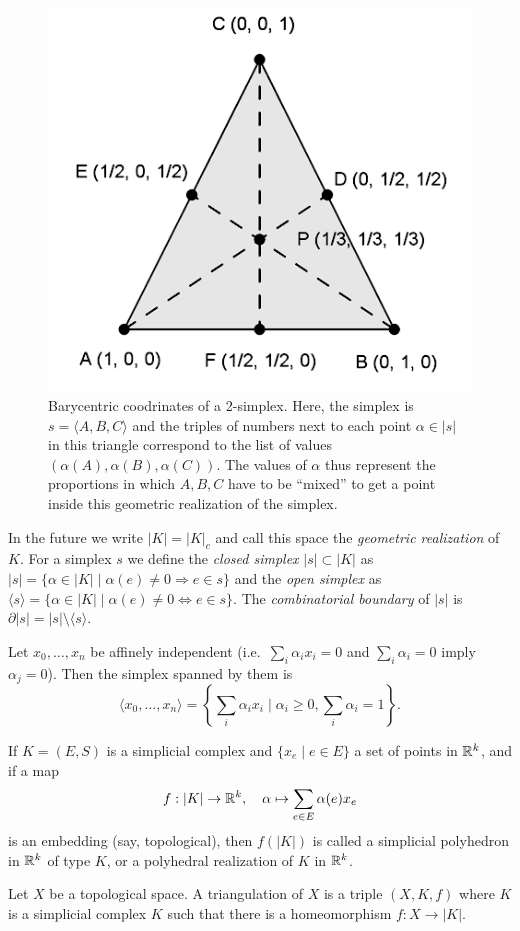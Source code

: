 \begin{figure}[tp]
    \centering
    \includegraphics[scale=0.3]{figures/barycentric.png}
    \caption{Barycentric coodrinates of a 2-simplex. Here, the simplex is $s=\langle A,B,C\rangle$ and the triples of numbers next to each point $\alpha\in |s|$ in this triangle correspond to the list of values $(\alpha(A),\alpha(B),\alpha(C))$. The values of $\alpha$ thus represent the proportions in which $A,B,C$ have to be ``mixed'' to get a point inside this geometric realization of the simplex.\label{fig. simplex}}
\end{figure}


In the future we write $|K|=|K|_c$ and call this space the \emph{geometric realization} of $K$. For a simplex $s$ we define the \emph{closed simplex} $|s|\subset |K|$ as $|s|=\{\alpha\in|K|\mid \alpha(e)\neq 0\Rightarrow e\in s\}$ and the \emph{open simplex} as $\langle s\rangle=\{\alpha\in |K|\mid \alpha(e)\neq 0\Leftrightarrow e\in s\}$. The \emph{combinatorial boundary} of $|s|$ is $\partial|s|=|s|\setminus\langle s\rangle$.

\begin{defn}
    Let $x_0,\ldots,x_n$ be affinely independent (i.e.\ $\sum_i\alpha_i x_i=0$ and $\sum_i\alpha_i=0$ imply $\alpha_j=0$). Then the simplex spanned by them is \[\langle x_0,\ldots,x_n\rangle=\left\{\sum_i \alpha_i x_i\mid \alpha_i\geq 0,\sum_i \alpha_i=1\right\}.\]
\end{defn}
\begin{defn}
    If $K=(E,S)$ is a simplicial complex and $\{x_e\mid e\in E\}$ a set of points in $\mathbb{R}^k$, and if a map
    \[f:|K|\to \mathbb{R}^k,\quad \alpha\mapsto \sum_{e\in E}\alpha(e)x_e\]
    is an embedding (say, topological), then $f(|K|)$ is called a simplicial polyhedron in $\mathbb{R}^k$ of type $K$, or a polyhedral realization of $K$ in $\mathbb{R}^k$.
\end{defn}
\begin{defn}[Triangulation]
    Let $X$ be a topological space. A triangulation of $X$ is a triple $(X,K,f)$ where $K$ is a simplicial complex $K$ such that there is a homeomorphism $f:X\to |K|$.
\end{defn}

